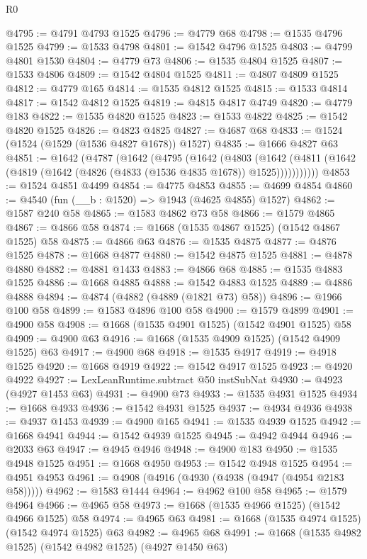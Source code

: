 \begin{lexlean}{R0}
\begin{coremodule}
@4795 := @4791 @4793 @1525
@4796 := @4779 @68
@4798 := @1535 @4796 @1525
@4799 := @1533 @4798
@4801 := @1542 @4796 @1525
@4803 := @4799 @4801 @1530
@4804 := @4779 @73
@4806 := @1535 @4804 @1525
@4807 := @1533 @4806
@4809 := @1542 @4804 @1525
@4811 := @4807 @4809 @1525
@4812 := @4779 @165
@4814 := @1535 @4812 @1525
@4815 := @1533 @4814
@4817 := @1542 @4812 @1525
@4819 := @4815 @4817 @4749
@4820 := @4779 @183
@4822 := @1535 @4820 @1525
@4823 := @1533 @4822
@4825 := @1542 @4820 @1525
@4826 := @4823 @4825
@4827 := @4687 @68
@4833 := @1524 (@1524 (@1529 (@1536 @4827 @1678)) @1527)
@4835 := @1666 @4827 @63
@4851 := @1642
    (@4787
      (@1642
        (@4795
          (@1642
            (@4803
              (@1642 (@4811 (@1642 (@4819 (@1642 (@4826 (@4833 (@1536 @4835 @1678)) @1525)))))))))))
@4853 := @1524 @4851 @4499
@4854 := @4775 @4853
@4855 := @4699 @4854
@4860 := @4540 (fun (__b : @1520) => @1943 (@4625 @4855) @1527)
@4862 := @1587 @240 @58
@4865 := @1583 @4862 @73 @58
@4866 := @1579 @4865
@4867 := @4866 @58
@4874 := @1668 (@1535 @4867 @1525) (@1542 @4867 @1525) @58
@4875 := @4866 @63
@4876 := @1535 @4875
@4877 := @4876 @1525
@4878 := @1668 @4877
@4880 := @1542 @4875 @1525
@4881 := @4878 @4880
@4882 := @4881 @1433
@4883 := @4866 @68
@4885 := @1535 @4883 @1525
@4886 := @1668 @4885
@4888 := @1542 @4883 @1525
@4889 := @4886 @4888
@4894 := @4874 (@4882 (@4889 (@1821 @73) @58))
@4896 := @1966 @100 @58
@4899 := @1583 @4896 @100 @58
@4900 := @1579 @4899
@4901 := @4900 @58
@4908 := @1668 (@1535 @4901 @1525) (@1542 @4901 @1525) @58
@4909 := @4900 @63
@4916 := @1668 (@1535 @4909 @1525) (@1542 @4909 @1525) @63
@4917 := @4900 @68
@4918 := @1535 @4917
@4919 := @4918 @1525
@4920 := @1668 @4919
@4922 := @1542 @4917 @1525
@4923 := @4920 @4922
@4927 := LexLeanRuntime.subtract @50 instSubNat
@4930 := @4923 (@4927 @1453 @63)
@4931 := @4900 @73
@4933 := @1535 @4931 @1525
@4934 := @1668 @4933
@4936 := @1542 @4931 @1525
@4937 := @4934 @4936
@4938 := @4937 @1453
@4939 := @4900 @165
@4941 := @1535 @4939 @1525
@4942 := @1668 @4941
@4944 := @1542 @4939 @1525
@4945 := @4942 @4944
@4946 := @2033 @63
@4947 := @4945 @4946
@4948 := @4900 @183
@4950 := @1535 @4948 @1525
@4951 := @1668 @4950
@4953 := @1542 @4948 @1525
@4954 := @4951 @4953
@4961 := @4908 (@4916 (@4930 (@4938 (@4947 (@4954 @2183 @58)))))
@4962 := @1583 @1444
@4964 := @4962 @100 @58
@4965 := @1579 @4964
@4966 := @4965 @58
@4973 := @1668 (@1535 @4966 @1525) (@1542 @4966 @1525) @58
@4974 := @4965 @63
@4981 := @1668 (@1535 @4974 @1525) (@1542 @4974 @1525) @63
@4982 := @4965 @68
@4991 := @1668 (@1535 @4982 @1525) (@1542 @4982 @1525) (@4927 @1450 @63)

\end{coremodule}
\end{lexlean}
